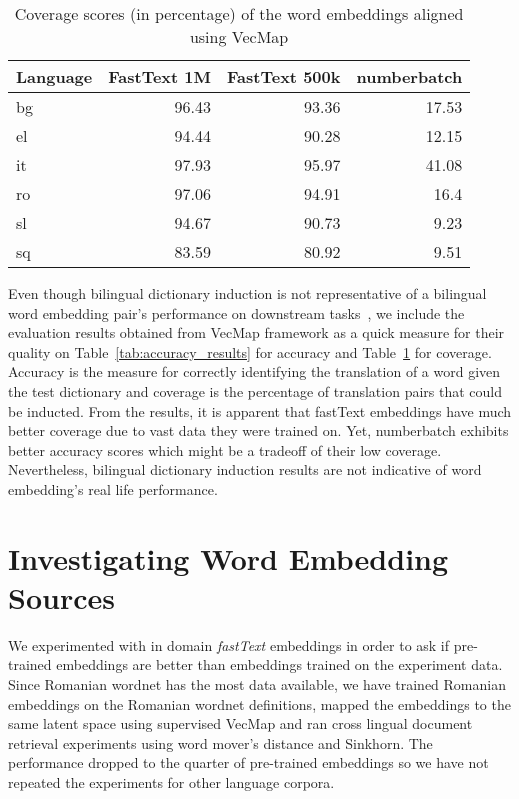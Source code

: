 \begin{table}[htbp]
    \centering
    \begin{tabular}{lrrr}
        \toprule
        \textbf{Language} & \textbf{FastText 1M} & \textbf{FastText 500k} & \textbf{numberbatch} \\
        \midrule
        bg & 96.43 & 93.36 & 17.53 \\
        el & 94.44 & 90.28 & 12.15 \\
        it & 97.93 & 95.97 & 41.08 \\
        ro & 97.06 & 94.91 & 16.4 \\
        sl & 94.67 & 90.73 & 9.23 \\
        sq & 83.59 & 80.92 & 9.51 \\
        \bottomrule
    \end{tabular}
    \caption{Coverage scores (in percentage) of the word embeddings aligned using VecMap}%
    \label{tab:coverage_results}
\end{table}

Even though bilingual dictionary induction is not representative of a bilingual word embedding pair's performance on downstream tasks~\cite{ruder_survey_2017,glavas_how_2019}, we include the evaluation results obtained from VecMap framework as a quick measure for their quality on Table~\ref{tab:accuracy_results} for accuracy and Table~\ref{tab:coverage_results} for coverage.
Accuracy is the measure for correctly identifying the translation of a word given the test dictionary and coverage is the percentage of translation pairs that could be inducted.
From the results, it is apparent that fastText embeddings have much better coverage due to vast data they were trained on.
Yet, numberbatch exhibits better accuracy scores which might be a tradeoff of their low coverage.
Nevertheless, bilingual dictionary induction results are not indicative of word embedding's real life performance.


\section{Investigating Word Embedding Sources}%
\label{sec:investigating_word_embedding_sources}

We experimented with in domain \emph{fastText} embeddings in order to ask if pre-trained embeddings are better than embeddings trained on the experiment data.
Since Romanian wordnet has the most data available, we have trained Romanian embeddings on the Romanian wordnet definitions, mapped the embeddings to the same latent space using supervised VecMap and ran cross lingual document retrieval experiments using word mover's distance and Sinkhorn.
The performance dropped to the quarter of pre-trained embeddings so we have not repeated the experiments for other language corpora.


